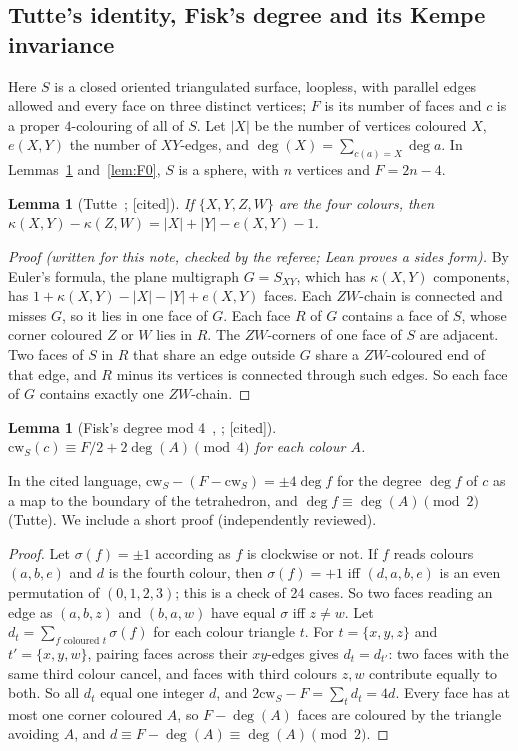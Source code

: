 \documentclass[11pt]{article}
\newtheorem{lemma}[theorem]{Lemma}
\theoremstyle{definition}
\newcommand{\lab}[1]{\textsf{[#1]}}
\newcommand{\cw}{\mathrm{cw}}
\begin{document}
\subsection{Tutte's identity, Fisk's degree and its Kempe invariance}
Here $S$ is a closed oriented triangulated surface, loopless, with parallel edges allowed and every face on three distinct vertices; $F$ is its number of faces and $c$ is a proper $4$-colouring of all of $S$. Let $|X|$ be the number of vertices coloured $X$, $e(X,Y)$ the number of $XY$-edges, and $\deg(X)=\sum_{c(a)=X}\deg a$. In Lemmas~\ref{lem:tutte} and~\ref{lem:F0}, $S$ is a sphere, with $n$ vertices and $F=2n-4$.

\begin{lemma}[Tutte~\cite{tutte1969,mohar2021}; \lab{cited}]\label{lem:tutte}
If $\{X,Y,Z,W\}$ are the four colours, then $\kappa(X,Y)-\kappa(Z,W)=|X|+|Y|-e(X,Y)-1$.
\end{lemma}
\begin{proof}[Proof (written for this note, checked by the referee; Lean proves a sides form)]
By Euler's formula, the plane multigraph $G=S_{XY}$, which has $\kappa(X,Y)$ components, has $1+\kappa(X,Y)-|X|-|Y|+e(X,Y)$ faces. Each $ZW$-chain is connected and misses $G$, so it lies in one face of $G$. Each face $R$ of $G$ contains a face of $S$, whose corner coloured $Z$ or $W$ lies in $R$. The $ZW$-corners of one face of $S$ are adjacent. Two faces of $S$ in $R$ that share an edge outside $G$ share a $ZW$-coloured end of that edge, and $R$ minus its vertices is connected through such edges. So each face of $G$ contains exactly one $ZW$-chain.
\end{proof}

\begin{lemma}[Fisk's degree mod 4~\cite{fisk1977}, {\cite[Lemma~3.1]{moharsalas2009}}; \lab{cited}]\label{lem:fisk}
$\cw_S(c)\equiv F/2+2\deg(A)\pmod 4$ for each colour $A$.
\end{lemma}
In the cited language, $\cw_S-(F-\cw_S)=\pm4\deg f$ for the degree $\deg f$ of $c$ as a map to the boundary of the tetrahedron, and $\deg f\equiv\deg(A)\pmod 2$ (Tutte). We include a short proof (independently reviewed).
\begin{proof}
Let $\sigma(f)=\pm1$ according as $f$ is clockwise or not. If $f$ reads colours $(a,b,e)$ and $d$ is the fourth colour, then $\sigma(f)=+1$ iff $(d,a,b,e)$ is an even permutation of $(0,1,2,3)$; this is a check of 24 cases. So two faces reading an edge as $(a,b,z)$ and $(b,a,w)$ have equal $\sigma$ iff $z\ne w$. Let $d_t=\sum_{f\text{ coloured }t}\sigma(f)$ for each colour triangle $t$. For $t=\{x,y,z\}$ and $t'=\{x,y,w\}$, pairing faces across their $xy$-edges gives $d_t=d_{t'}$: two faces with the same third colour cancel, and faces with third colours $z,w$ contribute equally to both. So all $d_t$ equal one integer $d$, and $2\cw_S-F=\sum_t d_t=4d$. Every face has at most one corner coloured $A$, so $F-\deg(A)$ faces are coloured by the triangle avoiding $A$, and $d\equiv F-\deg(A)\equiv\deg(A)\pmod 2$.
\end{proof}
\end{document}
